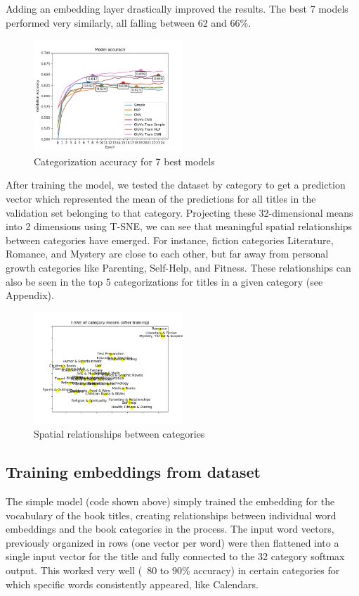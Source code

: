 \documentclass[jou,apacite, 10px]{apa6}
\begin{document}
Adding an embedding layer drastically improved the results. The best 7 models performed very similarly, all falling between 62 and 66\%.

\begin{figure}[h!]
\captionsetup{justification=centering}
    \centering
     \includegraphics[width=0.5\textwidth]{images/good_models_comparison_small}
        \caption{Categorization accuracy for 7 best models}
\end{figure}

After training the model, we tested the dataset by category to get a prediction vector which represented the mean of the predictions for all titles in the validation set belonging to that category. Projecting these 32-dimensional means into 2 dimensions using T-SNE, we can see that meaningful spatial relationships between categories have emerged. For instance, fiction categories Literature, Romance, and Mystery are close to each other, but far away from personal growth categories like Parenting, Self-Help, and Fitness. These relationships can also be seen in the top 5 categorizations for titles in a given category (see Appendix).

\begin{figure}[h!]
\captionsetup{justification=centering}
    \centering
     \includegraphics[width=0.5\textwidth]{images/tsne-categories-small}
        \caption{Spatial relationships between categories}
\end{figure}

\subsection{Training embeddings from dataset}
The simple model (code shown above) simply trained the embedding for the vocabulary of the book titles, creating relationships between individual word embeddings and the book categories in the process. The input word vectors, previously organized in rows (one vector per word) were then flattened into a single input vector for the title and fully connected to the 32 category softmax output. This worked very well (~80 to 90\% accuracy) in certain categories for which specific words consistently appeared, like Calendars.\\
\end{document}
